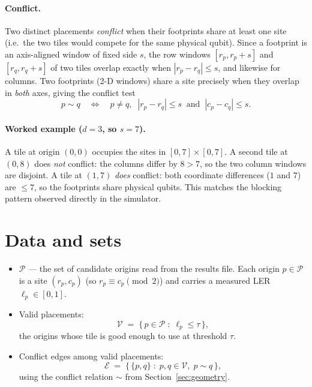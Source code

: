 \documentclass[11pt]{article}
\newcommand{\Pset}{\mathcal{P}}
\newcommand{\Vset}{\mathcal{V}}
\newcommand{\Eset}{\mathcal{E}}
\begin{document}
\paragraph{Conflict.}
Two distinct placements \emph{conflict} when their footprints share at least one site (i.e.\
the two tiles would compete for the same physical qubit). Since a footprint is an
axis-aligned window of fixed side $s$, the row windows $[r_p, r_p + s]$ and $[r_q, r_q + s]$
of two tiles overlap exactly when $|r_p - r_q| \le s$, and likewise for columns. Two footprints
(2-D windows) share a site precisely when they overlap in \emph{both} axes, giving the
conflict test
\[
  p \sim q
  \quad\Longleftrightarrow\quad
  p \neq q,\;\;
  |r_p - r_q| \le s
  \;\;\text{and}\;\;
  |c_p - c_q| \le s .
\]

\paragraph{Worked example ($d=3$, so $s=7$).}
A tile at origin $(0,0)$ occupies the sites in $[0,7]\times[0,7]$. A second tile at $(0,8)$
does \emph{not} conflict: the columns differ by $8 > 7$, so the two column windows are
disjoint. A tile at $(1,7)$ \emph{does} conflict: both coordinate differences ($1$ and $7$)
are $\le 7$, so the footprints share physical qubits. This matches the blocking pattern
observed directly in the simulator.

\section{Data and sets}

\begin{itemize}[itemsep=2pt]
  \item $\Pset$ --- the set of candidate origins read from the results file. Each origin
        $p \in \Pset$ is a site $(r_p, c_p)$ (so $r_p \equiv c_p \pmod 2$) and carries a
        measured LER $\ell_p \in [0,1]$.
  \item Valid placements:
        \[
          \Vset \;=\; \{\, p \in \Pset \;:\; \ell_p \le \tau \,\},
        \]
        the origins whose tile is good enough to use at threshold $\tau$.
  \item Conflict edges among valid placements:
        \[
          \Eset \;=\; \bigl\{\, \{p,q\} \;:\; p,q \in \Vset,\; p \sim q \,\bigr\},
        \]
        using the conflict relation $\sim$ from Section~\ref{sec:geometry}.
\end{itemize}
\end{document}
